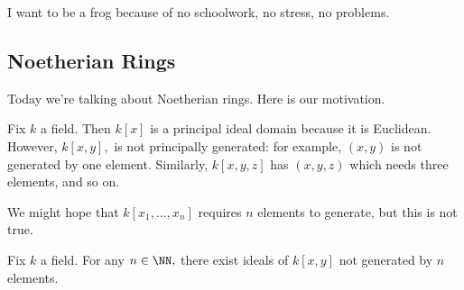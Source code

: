 \documentclass[../notes.tex]{subfiles}
\begin{document}













I want to be a frog because of no schoolwork, no stress, no problems.

\subsection{Noetherian Rings}
Today we're talking about Noetherian rings. Here is our motivation.
\begin{example}
	Fix $k$ a field. Then $k[x]$ is a principal ideal domain because it is Euclidean. However, $k[x,y],$ is not principally generated: for example, $(x,y)$ is not generated by one element. Similarly, $k[x,y,z]$ has $(x,y,z)$ which needs three elements, and so on.
\end{example}
We might hope that $k[x_1,\ldots,x_n]$ requires $n$ elements to generate, but this is not true.
\begin{exercise}
	Fix $k$ a field. For any $n\in\NN,$ there exist ideals of $k[x,y]$ not generated by $n$ elements.
\end{exercise}
\end{document}
